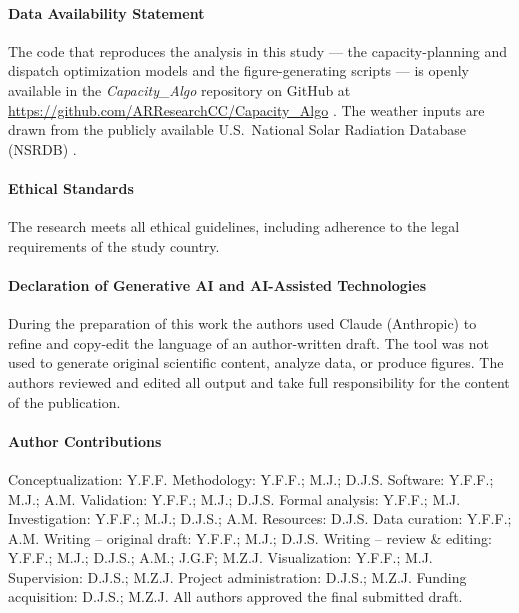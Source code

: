 \documentclass[
  journal=large,
  manuscript=article-type,
  year=2020,
  volume=37,
]{cup-journal}
\begin{document}
\paragraph{Data Availability Statement}
The code that reproduces the analysis in this study --- the capacity-planning and dispatch
optimization models and the figure-generating scripts --- is openly available in the
\emph{Capacity\_Algo} repository on GitHub at
\url{https://github.com/ARResearchCC/Capacity_Algo} \parencite{capacityalgo}. The weather inputs
are drawn from the publicly available U.S.\ National Solar Radiation Database (NSRDB)
\parencite{ref35}.

\paragraph{Ethical Standards}
The research meets all ethical guidelines, including adherence to the legal requirements of the study country.

\paragraph{Declaration of Generative AI and AI-Assisted Technologies}
During the preparation of this work the authors used Claude (Anthropic) to refine and copy-edit
the language of an author-written draft. The tool was not used to generate original scientific
content, analyze data, or produce figures. The authors reviewed and edited all output and take
full responsibility for the content of the publication.

\paragraph{Author Contributions}
\noindent
Conceptualization: Y.F.F. 
Methodology: Y.F.F.; M.J.; D.J.S. 
Software: Y.F.F.; M.J.; A.M. 
Validation: Y.F.F.; M.J.; D.J.S. 
Formal analysis: Y.F.F.; M.J. 
Investigation: Y.F.F.; M.J.; D.J.S.; A.M. 
Resources: D.J.S. 
Data curation: Y.F.F.; A.M. 
Writing -- original draft: Y.F.F.; M.J.; D.J.S. Writing -- review \& editing: Y.F.F.; M.J.; D.J.S.; A.M.; J.G.F; M.Z.J. 
Visualization: Y.F.F.; M.J. 
Supervision: D.J.S.; M.Z.J. 
Project administration: D.J.S.; M.Z.J. 
Funding acquisition: D.J.S.; M.Z.J. 
All authors approved the final submitted draft.

\printbibliography
\end{document}
